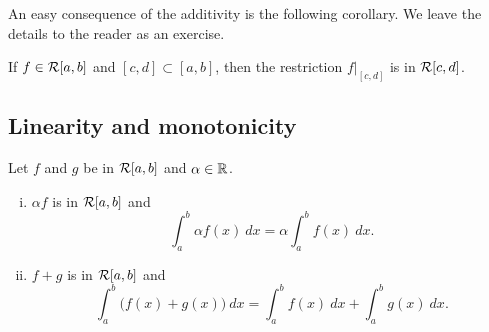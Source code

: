An easy consequence of the additivity is the following corollary.  We
leave the details to the reader as an exercise.

\begin{cor} \label{intsubcor}
If $f \in {\mathcal{R}}[a,b]$ and
$[c,d] \subset [a,b]$, then
the restriction $f|_{[c,d]}$ is in ${\mathcal{R}}[c,d]$.
\end{cor}

\subsection{Linearity and monotonicity}

\begin{prop}[Linearity]
Let $f$ and $g$ be in ${\mathcal{R}}[a,b]$ and $\alpha \in {\mathbb{R}}$.
\begin{enumerate}[(i)]
\item $\alpha f$ is in ${\mathcal{R}}[a,b]$ and
\begin{equation*}
\int_a^b \alpha f(x) ~dx = \alpha \int_a^b f(x) ~dx .
\end{equation*}
\item $f+g$ is in ${\mathcal{R}}[a,b]$ and
\begin{equation*}
\int_a^b \bigl( f(x)+g(x) \bigr) ~dx = 
\int_a^b f(x) ~dx 
+
\int_a^b g(x) ~dx .
\end{equation*}
\end{enumerate}
\end{prop}

